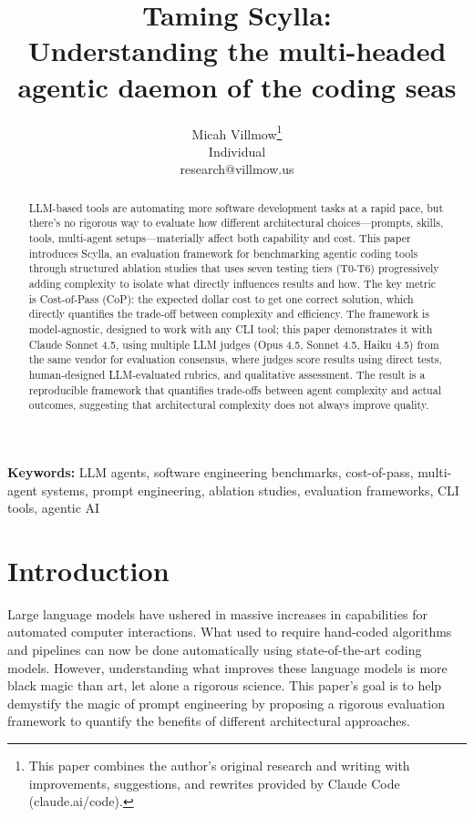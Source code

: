 \documentclass[11pt]{article}
\title{Taming Scylla: \\
Understanding the multi-headed agentic daemon of the coding seas}
\author{Micah Villmow\thanks{This paper combines the author's original research and writing with improvements, suggestions, and rewrites provided by Claude Code (claude.ai/code).} \\
Individual \\
research@villmow.us}
\date{}
\begin{document}
\maketitle

\begin{abstract}
LLM-based tools are automating more software development tasks at a rapid pace, but
there's no rigorous way to evaluate how different architectural choices—prompts,
skills, tools, multi-agent setups—materially affect both capability and cost.
This paper introduces Scylla, an evaluation framework for benchmarking agentic
coding tools through structured ablation studies that uses seven
testing tiers (T0-T6) progressively adding complexity to isolate
what directly influences results and how.
The key metric is Cost-of-Pass (CoP): the expected dollar cost to get one
correct solution, which directly quantifies the trade-off between complexity and
efficiency.
The framework is model-agnostic, designed to work with any CLI tool; this paper
demonstrates it with Claude Sonnet 4.5, using multiple LLM judges (Opus 4.5,
Sonnet 4.5, Haiku 4.5) from the same vendor for evaluation consensus, where judges
score results using direct tests, human-designed LLM-evaluated rubrics, and qualitative
assessment.
The result is a reproducible framework that quantifies trade-offs between agent
complexity and actual outcomes, suggesting that architectural complexity does not always improve quality.
\end{abstract}

\noindent\textbf{Keywords:} LLM agents, software engineering benchmarks, cost-of-pass, multi-agent systems,
prompt engineering, ablation studies, evaluation frameworks, CLI tools, agentic
AI

\section{Introduction}\label{sec:intro}

Large language models have ushered in massive increases in capabilities for
automated computer interactions. What used to require hand-coded algorithms and
pipelines can now be done automatically using state-of-the-art coding models.
However, understanding what improves these language models is more black
magic than art, let alone a rigorous science. This paper's goal is to help
demystify the magic of prompt engineering by proposing a rigorous evaluation
framework to quantify the benefits of different architectural approaches.
\end{document}
